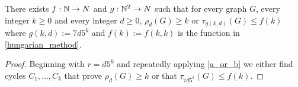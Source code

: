 \documentclass{patmorin}
\renewcommand{\ge}{\geqslant}
\renewcommand{\le}{\leqslant}
\begin{document}
\begin{thm}
  There exists $f:\mathbb{N}\to N$ and $g:\mathbb{N}^2\to N$ such that for every graph $G$, every integer $k\ge 0$ and every integer $d\ge 0$, $\rho_d(G)\ge k$ or $\tau_{g(k,d)}(G)\le f(k)$ where $g(k,d):=7d5^k$ and $f(k):=f(k,k)$ is the function in \cref{hungarian_method}.
\end{thm}

\begin{proof}
  Beginning with $r=d5^k$ and repeatedly applying \cref{a_or_b} we either find cycles $C_1,\ldots,C_k$ that prove $\rho_d(G)\ge k$ or that $\tau_{7d5^k}(G) \le f(k)$.
\end{proof}
\end{document}
